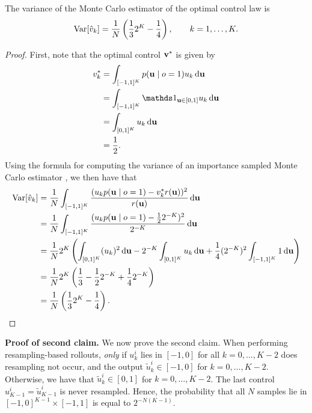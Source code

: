 \begin{lemma}
    The variance of the Monte Carlo estimator of the optimal control law is
    \begin{equation}
        \operatorname{Var}[\hat{v}_k] = \frac{1}{N}\left( \frac{1}{3} 2^K - \frac{1}{4} \right), \qquad k = 1, \dots, K.
    \end{equation}
\end{lemma}
\begin{proof}
First, note that the optimal control ${\bf v}^*$ is given by
\begin{align}
    v^*_k
    &= \int_{[-1, 1]^K} p(\vu \mid o=1) u_k \diff{\vu} \\
    &= \int_{[-1, 1]^K} \ind{\vu \in [0, 1]} u_k \diff{\vu} \\
    &= \int_{[0, 1]^K} u_k \diff{\vu} \\
    &= \frac{1}{2}.
\end{align}
Using the formula for computing the variance of an importance sampled Monte Carlo estimator \cite{owen2013monte}, we then have that
\begin{align}
    \operatorname{Var}[\hat{v}_k]
    &= \frac{1}{N} \int_{[-1, 1]^K} \frac{ ( u_k p({\bf u} \mid o=1) - v^*_k r({\bf u}) )^2 }{ r({\bf u}) } \mathop{}\!\mathrm{d}{{\bf u}} \\
    &= \frac{1}{N} \int_{[-1, 1]^K} \frac{ ( u_k p({\bf u} \mid o=1) - \frac{1}{2} 2^{-K} )^2 }{ 2^{-K} } \mathop{}\!\mathrm{d}{{\bf u}} \\
    &= \frac{1}{N} 2^K \left( \int_{[0, 1]^K} (u_k)^2 \mathop{}\!\mathrm{d}{{\bf u}} - 2^{-K} \int_{[0, 1]^K} u_k \mathop{}\!\mathrm{d}{{\bf u}} + \frac{1}{4} (2^{-K})^2 \int_{[-1, 1]^K} 1 \mathop{}\!\mathrm{d}{{\bf u}} \right) \\
    &= \frac{1}{N} 2^K \left( \frac{1}{3} - \frac{1}{2} 2^{-K} + \frac{1}{4} 2^{-K} \right) \\
    &= \frac{1}{N}\left( \frac{1}{3} 2^K - \frac{1}{4} \right).
\end{align}
\end{proof}

\noindent\textbf{Proof of second claim.}
We now prove the second claim.
When performing resampling-based rollouts, \textit{only} if $u^i_k$ lies in $[-1, 0]$ for all $k = 0, \dots, K - 2$ does resampling not occur, and the output $\tilde{u}^i_k \in [-1, 0]$ for $k = 0, \dots, K-2$.
Otherwise, we have that $\tilde{u}^i_k \in [0, 1]$ for $k = 0, \dots, K-2$.
The last control $u^i_{K-1} = \tilde{u}^i_{K-1}$ is never resampled.
Hence, the probability that all $N$ samples lie in $[-1, 0]^{K-1} \times [-1, 1]$ is equal to $2^{-N(K-1)}$.

